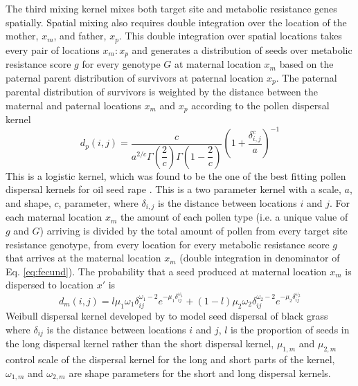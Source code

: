 \documentclass[12pt, a4paper]{article}
\begin{document}
The third mixing kernel mixes both target site and metabolic resistance genes spatially. Spatial mixing also requires double integration over the location of the mother, $x_m$, and father, $x_p$. This double integration over spatial locations takes every pair of locations $x_m:x_p$ and generates a distribution of seeds over metabolic resistance score $g$ for every genotype $G$ at maternal location $x_m$ based on the paternal parent distribution of survivors at paternal location $x_p$. The paternal parental distribution of survivors is weighted by the distance between the maternal and paternal locations $x_m$ and $x_p$ according to the pollen dispersal kernel 
\begin{equation}\label{eq:pollen_disp}
	d_p(i, j) = \frac{c}{a^{2/c}\Gamma\left(\dfrac{2}{c} \right)\Gamma\left(1 - \dfrac{2}{c} \right)}\left( 1 + \dfrac{\delta_{i,j}^c}{a} \right)^{-1} 
\end{equation} 
This is a logistic kernel, which was found to be the one of the best fitting pollen dispersal kernels for oil seed rape \citep{Klei2006}. This is a two parameter kernel with a scale, $a$, and shape, $c$, parameter, where $\delta_{i,j}$ is the distance between locations $i$ and $j$. For each maternal location $x_m$ the amount of each pollen type (i.e. a unique value of $g$ and $G$) arriving is divided by the total amount of pollen from every target site resistance genotype, from every location for every metabolic resistance score $g$ that arrives at the maternal location $x_m$ (double integration in denominator of Eq. \ref{eq:fecund}). The probability that a seed produced at maternal location $x_m$ is dispersed to location $x'$ is 
\begin{equation}\label{eq:seed_disp}
	d_m(i, j) = l \mu_1 \omega_1 \delta_{ij}^{\omega_1 - 2}e^{-\mu_1 \delta_{ij}^{\omega_1}} + (1 - l) \mu_2 \omega_2 \delta_{ij}^{\omega_2 - 2}e^{-\mu_2\delta_{ij}^{\omega_2}}
\end{equation} 
Weibull dispersal kernel developed by \cite{Colb2001} to model seed dispersal of black grass where $\delta_{ij}$ is the distance between locations $i$ and $j$, $l$ is the proportion of seeds in the long dispersal kernel rather than the short dispersal kernel, $\mu_{1, m}$ and $\mu_{2, m}$ control scale of the dispersal kernel for the long and short parts of the kernel, $\omega_{1, m}$ and $\omega_{2, m}$ are shape parameters for the short and long dispersal kernels.    
\end{document}
